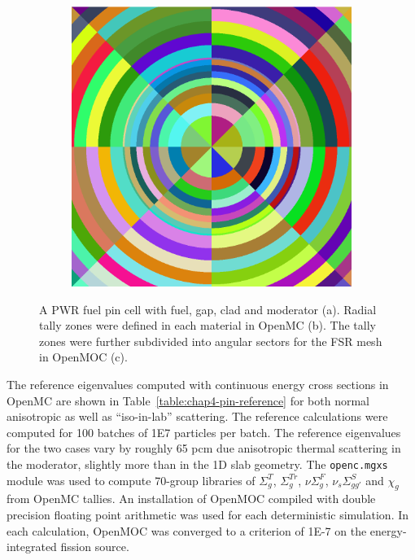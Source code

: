\begin{figure}[H]
\begin{subfigure}{.32\textwidth}
  \caption{}
\end{subfigure}
\begin{subfigure}{.32\textwidth}
  \centering
  \includegraphics[width=0.9\linewidth]{figures/biases/pin-cell/pin-cell-8x8}
  \caption{}
\end{subfigure}
\caption[Pin cell materials and geometry]{A PWR fuel pin cell with fuel, gap, clad and moderator (a). Radial tally zones were defined in each material in OpenMC (b). The tally zones were further subdivided into angular sectors for the \ac{FSR} mesh in OpenMOC (c).}
\label{fig:chap4-pin-cell}
\end{figure}

The reference eigenvalues computed with continuous energy cross sections in OpenMC are shown in Table~\ref{table:chap4-pin-reference} for both normal anisotropic as well as ``iso-in-lab'' scattering. The reference calculations were computed for 100 batches of 1E7 particles per batch. The reference eigenvalues for the two cases vary by roughly 65 pcm due anisotropic thermal scattering in the moderator, slightly more than in the 1D slab geometry. The \texttt{openc.mgxs} module was used to compute 70-group libraries of $\Sigma^T_g$, $\Sigma^{Tr}_g$, $\nu\Sigma^F_g$, $\nu_s\Sigma^S_{gg'}$ and $\chi_g$ from OpenMC tallies. An installation of OpenMOC compiled with double precision floating point arithmetic was used for each deterministic simulation. In each calculation, OpenMOC was converged to a criterion of 1E-7 on the energy-integrated fission source.

